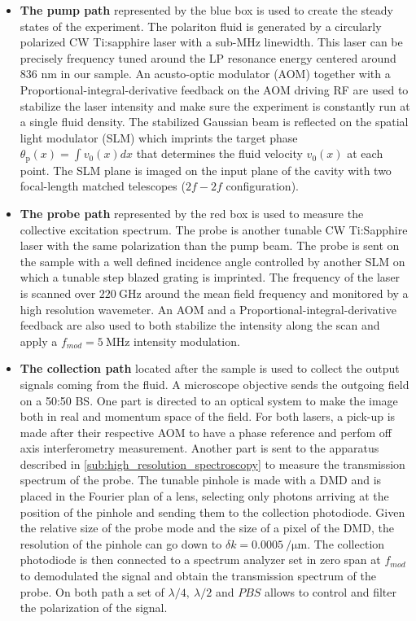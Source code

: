  \begin{itemize}
    \item \textbf{The pump path} represented by the blue box is used to create the steady states of the experiment. The polariton fluid is generated by a circularly polarized CW Ti:sapphire laser with a sub-MHz linewidth. This laser can be precisely frequency tuned around the LP resonance energy centered around 836 nm in our sample. An acusto-optic modulator (AOM) 
    together with a Proportional-integral-derivative feedback on the AOM driving RF are used to stabilize the laser intensity and make sure the experiment is constantly run at a single fluid density.
    The stabilized Gaussian beam is reflected on the spatial light modulator (SLM) which imprints the target phase $\theta_\mathrm{p}(x)=\int v_0(x)dx$ that determines the fluid velocity $v_0(x)$ at each point. The SLM plane is imaged on the input plane of the cavity with two focal-length matched telescopes ($2f-2f$ configuration).
    \item \textbf{The probe path} represented by the red box is used to measure the collective excitation spectrum. The probe is another tunable CW Ti:Sapphire laser with the same polarization than the pump beam. The probe is sent on the sample with a well defined incidence angle controlled by another SLM on which a tunable step blazed grating is imprinted. The frequency of
    the laser is scanned over $\SI{220}{\giga\hertz}$ around the mean field frequency and monitored by a high resolution wavemeter. An AOM and a Proportional-integral-derivative feedback are also used to both stabilize the intensity along the scan and apply a $f_{mod}=\SI{5}{\mega\hertz}$ intensity modulation.
    \item \textbf{The collection path} located after the sample is used to collect the output signals coming from the fluid. A microscope objective sends the outgoing field on a 50:50 BS. One part is directed to an optical system to make the image both in real and momentum space of the field. For both lasers, a pick-up is made after their respective AOM to have a phase reference and perfom off axis interferometry measurement. Another part is sent to the apparatus described in \autoref{sub:high_resolution_spectroscopy} to measure the transmission spectrum of the probe. The tunable
    pinhole is made with a DMD and is placed in the Fourier plan of a lens, selecting only photons arriving at the position of the pinhole and sending them to the collection photodiode. Given 
    the relative size of the probe mode and the size of a pixel of the DMD, the resolution of the pinhole can go down to $\delta k = \SI{0.0005}{\per \micro\meter}$. The collection photodiode is then connected to a spectrum analyzer set in zero span at $f_{mod}$ to demodulated the signal and obtain the transmission spectrum of the probe. On both path
    a set of $\lambda/4,\ \lambda/2$ and $PBS$ allows to control and filter the polarization of the signal.  
 \end{itemize}

